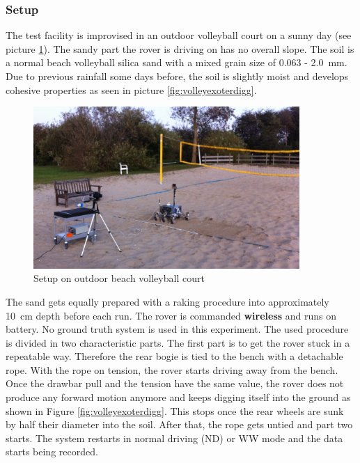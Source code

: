 \documentclass[a4paper,twocolumn]{esapub2005} %
\begin{document}
\subsubsection{Setup} The test facility is improvised in an outdoor volleyball
court on a sunny day (see picture \ref{fig:volley}). The sandy part the rover
is driving on has no overall slope. The soil is a normal beach volleyball
silica sand with a mixed grain size of 0.063 - 2.0~\unit{mm}. Due to previous rainfall
some days before, the soil is slightly moist and develops cohesive properties
as seen in picture \ref{fig:volleyexoterdigg}. 

\begin{figure}[h!]
    \centering
    \includegraphics[width=0.9\textwidth]{volley.jpg}
    \caption{Setup on outdoor beach volleyball court}
    \label{fig:volley}
\end{figure}



The sand gets equally prepared with a raking procedure into approximately 10~\unit{cm} depth before each run.  The rover is commanded \textbf{wireless} and runs on battery. No ground truth system is used in this experiment. The used procedure is divided in two characteristic parts. The first part is to get the rover stuck in a repeatable way. Therefore the rear bogie is tied to the bench with a detachable rope. With the rope on tension, the rover starts driving away from the bench. Once the drawbar pull and the tension have the same value, the rover does not produce any forward motion anymore and keeps digging itself into the ground as shown in Figure \ref{fig:volleyexoterdigg}. This stops once the rear wheels are sunk by half their diameter into the soil. After that, the rope gets untied and part two starts. The system restarts in normal driving (ND) or WW mode and the data starts being recorded. 
\end{document}
